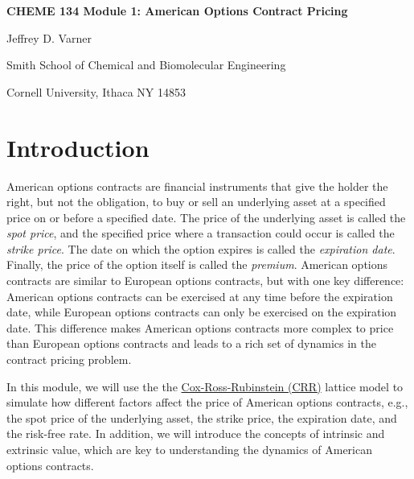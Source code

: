 \documentclass[11pt]{article}
\theoremstyle{definition}
\newcommand{\newterm}[1]{{\it #1}}
\begin{document}
{\par\centering\textbf{\Large CHEME 134 Module 1: American Options Contract Pricing}}
\vspace{0.2in}
{\par \centering \large{Jeffrey D. Varner}}
\vspace{0.05in}
{\par \centering \large{Smith School of Chemical and Biomolecular Engineering}}
{\par \centering \large{Cornell University, Ithaca NY 14853}}

\date{}
\thispagestyle{empty}

\setcounter{page}{1}

\section*{Introduction}
American options contracts are financial instruments that give the holder the right, but not the obligation, 
to buy or sell an underlying asset at a specified price on or before a specified date. 
The price of the underlying asset is called the \newterm{spot price}, 
and the specified price where a transaction could occur is called the \newterm{strike price}. 
The date on which the option expires is called the \newterm{expiration date}. 
Finally, the price of the option itself is called the \newterm{premium}. American options contracts are similar to European options contracts, 
but with one key difference: American options contracts can be exercised at any time before the expiration date, 
while European options contracts can only be exercised on the expiration date. 
This difference makes American options contracts more complex to price than European options contracts
and leads to a rich set of dynamics in the contract pricing problem.

In this module, we will use the the \href{https://en.wikipedia.org/wiki/Binomial_options_pricing_model}{Cox-Ross-Rubinstein (CRR)} 
lattice model to simulate how different factors affect the price of American options contracts, e.g., the 
spot price of the underlying asset, the strike price, the expiration date, and the risk-free rate.
In addition, we will introduce the concepts of intrinsic and extrinsic value, which are key to understanding
the dynamics of American options contracts. 
\end{document}
